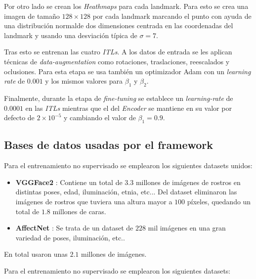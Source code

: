                 \medskip

                \noindent Por otro lado se crean los \textit{Heathmaps} para cada landmark. Para esto se crea una imagen de tamaño $128 \times 128$ por cada landmark marcando el punto con ayuda de una distribución normalde dos dimensiones centrada en las coordenadas del landmark y usando una desviación típica de $\sigma=7$.

                \medskip

                \noindent Tras esto se entrenan las cuatro \textit{ITLs}. A los datos de entrada se les aplican técnicas de \textit{data-augmentation} como rotaciones, traslaciones, reescalados y oclusiones. Para esta etapa se usa también un optimizador Adam con un \textit{learning rate} de $0.001$ y los mismos valores para $\beta_1$ y $\beta_2$.

                \medskip

                \noindent Finalmente, durante la etapa de \textit{fine-tuning} se establece un \textit{learning-rate} de $0.0001$ en las \textit{ITLs} mientras que el del \textit{Encoder} se mantiene en su valor por defecto de $2 \times 10^{-5}$ y cambiando el valor de $\beta_1 = 0.9$.

            \subsection{Bases de datos usadas por el framework}
                
                \noindent Para el entrenamiento no supervisado se emplearon los siguientes datasets unidos: 

                \begin{itemize}
                    \item \textbf{VGGFace2} : Contiene un total de $3.3$ millones de imágenes de rostros en distintas poses, edad, iluminación, etnia, etc... Del dataset eliminaron las imágenes de rostros que tuviera una altura mayor a $100$ píxeles, quedando un total de $1.8$ millones de caras.
                    \item \textbf{AffectNet} : Se trata de un dataset de $228$ mil imágenes en una gran variedad de poses, iluminación, etc..
                \end{itemize}

                \noindent En total usaron unas $2.1$ millones de imágenes.

                \noindent Para el entrenamiento no supervisado se emplearon los siguientes datasets: 

